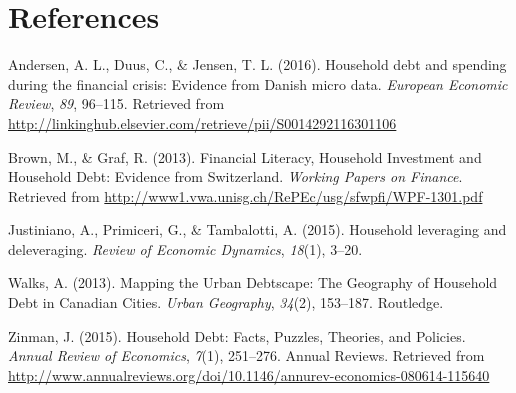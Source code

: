 \documentclass[10pt,twoside]{article}
\begin{document}
\hypertarget{references}{%
\section*{References}\label{references}}

\hypertarget{refs}{}
\leavevmode\hypertarget{ref-Andersen2016}{}%
Andersen, A. L., Duus, C., \& Jensen, T. L. (2016). Household debt and
spending during the financial crisis: Evidence from Danish micro data.
\emph{European Economic Review}, \emph{89}, 96--115. Retrieved from
\url{http://linkinghub.elsevier.com/retrieve/pii/S0014292116301106}

\leavevmode\hypertarget{ref-Brown2013}{}%
Brown, M., \& Graf, R. (2013). Financial Literacy, Household Investment
and Household Debt: Evidence from Switzerland. \emph{Working Papers on
Finance}. Retrieved from
\url{http://www1.vwa.unisg.ch/RePEc/usg/sfwpfi/WPF-1301.pdf}

\leavevmode\hypertarget{ref-Justiniano2015b}{}%
Justiniano, A., Primiceri, G., \& Tambalotti, A. (2015). Household
leveraging and deleveraging. \emph{Review of Economic Dynamics},
\emph{18}(1), 3--20.

\leavevmode\hypertarget{ref-Walks2013}{}%
Walks, A. (2013). Mapping the Urban Debtscape: The Geography of
Household Debt in Canadian Cities. \emph{Urban Geography}, \emph{34}(2),
153--187. Routledge.

\leavevmode\hypertarget{ref-Zinman2015}{}%
Zinman, J. (2015). Household Debt: Facts, Puzzles, Theories, and
Policies. \emph{Annual Review of Economics}, \emph{7}(1), 251--276.
Annual Reviews. Retrieved from
\url{http://www.annualreviews.org/doi/10.1146/annurev-economics-080614-115640}
\end{document}
